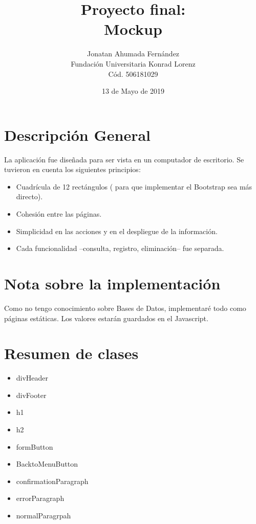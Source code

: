 \documentclass[11pt]{article}
\author{Jonatan Ahumada Fernández\\
Fundación Universitaria Konrad Lorenz\\
Cód. 506181029}
\date{13 de Mayo de 2019}
\title{Proyecto final:\\
Mockup}
\begin{document}
\maketitle




\section{Descripción General}
\label{sec-1}
La aplicación fue diseñada para ser vista en un computador de escritorio. 
Se tuvieron en cuenta los siguientes principios:

\begin{itemize}
\item Cuadrícula de 12 rectángulos ( para que implementar el Bootstrap sea más directo).
\item Cohesión entre las páginas.
\item Simplicidad en las acciones y en el despliegue de la información.
\item Cada funcionalidad --consulta, registro, eliminación-- fue separada.
\end{itemize}

\section{Nota sobre la implementación}
\label{sec-2}
Como no tengo conocimiento sobre Bases de Datos, implementaré todo como páginas estáticas. Los valores estarán 
guardados en el Javascript. 


\section{Resumen de clases}
\label{sec-3}
\begin{itemize}
\item divHeader
\item divFooter
\item h1
\item h2
\item formButton
\item BacktoMenuButton
\item confirmationParagraph
\item errorParagraph
\item normalParagrpah
\end{itemize}
\end{document}
